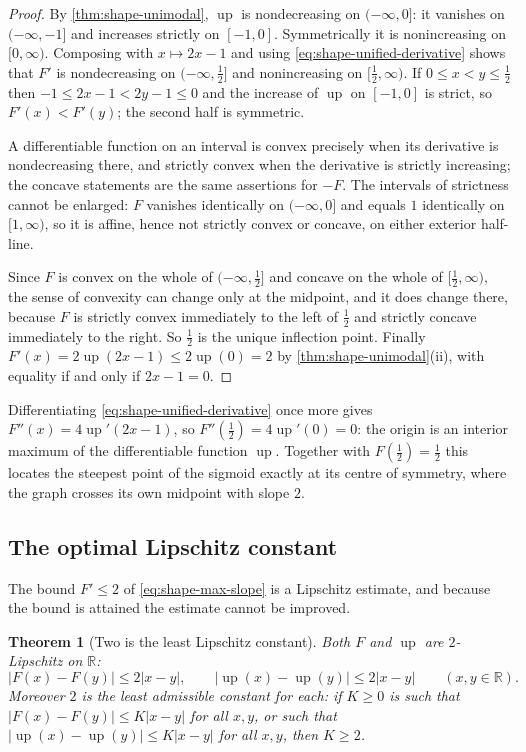 \documentclass[11pt,oneside]{article}
\newtheorem{theorem}{Theorem}[section]
\theoremstyle{definition}
\theoremstyle{remark}
\newcommand{\R}{\mathbb R}
\newcommand{\Up}{\operatorname{up}}
\begin{document}
\begin{proof}
By \cref{thm:shape-unimodal}, $\Up$ is nondecreasing on $(-\infty,0]$: it vanishes on
$(-\infty,-1]$ and increases strictly on $[-1,0]$.  Symmetrically it is nonincreasing on
$[0,\infty)$.  Composing with $x\mapsto2x-1$ and using
\eqref{eq:shape-unified-derivative} shows that $F'$ is nondecreasing on $(-\infty,\tfrac12]$
and nonincreasing on $[\tfrac12,\infty)$.  If $0\le x<y\le\tfrac12$ then
$-1\le2x-1<2y-1\le0$ and the increase of $\Up$ on $[-1,0]$ is strict, so $F'(x)<F'(y)$;
the second half is symmetric.

A differentiable function on an interval is convex precisely when its derivative is
nondecreasing there, and strictly convex when the derivative is strictly increasing; the
concave statements are the same assertions for $-F$.  The intervals of strictness cannot be
enlarged: $F$ vanishes identically on $(-\infty,0]$ and equals $1$ identically on
$[1,\infty)$, so it is affine, hence not strictly convex or concave, on either exterior
half-line.

Since $F$ is convex on the whole of $(-\infty,\tfrac12]$ and concave on the whole of
$[\tfrac12,\infty)$, the sense of convexity can change only at the midpoint, and it does
change there, because $F$ is strictly convex immediately to the left of $\tfrac12$ and
strictly concave immediately to the right.  So $\tfrac12$ is the unique inflection point.
Finally $F'(x)=2\Up(2x-1)\le2\Up(0)=2$ by \cref{thm:shape-unimodal}(ii), with equality if and
only if $2x-1=0$.
\end{proof}

Differentiating \eqref{eq:shape-unified-derivative} once more gives $F''(x)=4\Up'(2x-1)$, so
$F''(\tfrac12)=4\Up'(0)=0$: the origin is an interior maximum of the differentiable function
$\Up$.  Together with $F(\tfrac12)=\tfrac12$ this locates the steepest point of the sigmoid
exactly at its centre of symmetry, where the graph crosses its own midpoint with slope $2$.

\subsection{The optimal Lipschitz constant}
\label{shape:lipschitz}

The bound $F'\le2$ of \eqref{eq:shape-max-slope} is a Lipschitz estimate, and because the
bound is attained the estimate cannot be improved.

\begin{theorem}[Two is the least Lipschitz constant]
\label{thm:shape-lipschitz}
Both $F$ and $\Up$ are $2$-Lipschitz on $\R$:
\begin{equation}
 |F(x)-F(y)|\le2|x-y|,\qquad |\Up(x)-\Up(y)|\le2|x-y|\qquad(x,y\in\R).
                                                          \label{eq:shape-lipschitz}
\end{equation}
Moreover $2$ is the least admissible constant for each: if $K\ge0$ is such that
$|F(x)-F(y)|\le K|x-y|$ for all $x,y$, or such that $|\Up(x)-\Up(y)|\le K|x-y|$ for all
$x,y$, then $K\ge2$.
\end{theorem}
\end{document}

